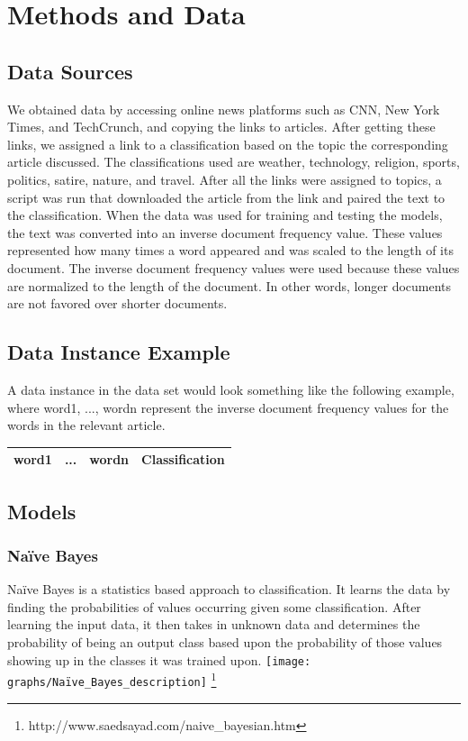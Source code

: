 \documentclass{article}
\begin{document}
    \section{Methods and Data}
        \subsection{Data Sources}
        We obtained data by accessing online news platforms such as CNN, New York Times, and 
        TechCrunch, and copying the links to articles. After getting these links, we assigned a 
        link to a classification based on the topic the corresponding article discussed. The 
        classifications used are weather, technology, religion, sports, politics, satire, 
        nature, and travel. After all the links were assigned to topics, a script was run that 
        downloaded the article from the link and paired the text to the classification. When the 
        data was used for training and testing the models, the text was converted into an inverse 
        document frequency value. These values represented how many times a word appeared and was 
        scaled to the length of its document. The inverse document frequency values were used 
        because these values are normalized to the length of the document. In other words, longer 
        documents are not favored over shorter documents.

        \subsection{Data Instance Example}
        A data instance in the data set would look something like the following example, where 
        word1, ..., wordn represent the inverse document frequency values for the words in the 
        relevant article.
        \begin{center}
            \begin{tabular}{|c|c|c|c|}
                \hline
                word1 & ... & wordn & Classification\\
                \hline
            \end{tabular}
        \end{center}
    
        \subsection{Models}
            \subsubsection{Na\"ive Bayes}
            Na\"ive Bayes is a statistics based approach to classification. It learns the data by 
            finding the probabilities of values occurring given some classification. After 
            learning the input data, it then takes in unknown data and determines the probability 
            of being an output class based upon the probability of those values showing up in the 
            classes it was trained upon.
            \texttt{[image: graphs/Naïve\_Bayes\_description]}
            \footnote{http://www.saedsayad.com/naive\_bayesian.htm}
\end{document}
